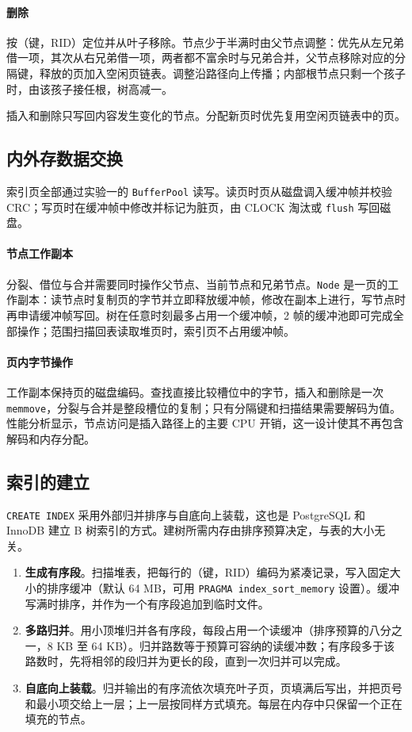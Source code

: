 \documentclass[11pt,a4paper]{ctexart}
\newcommand{\code}[1]{\texttt{#1}}
\begin{document}
\paragraph{删除}按（键，RID）定位并从叶子移除。节点少于半满时由父节点调整：优先从左兄弟借一项，其次从右兄弟借一项，两者都不富余时与兄弟合并，父节点移除对应的分隔键，释放的页加入空闲页链表。调整沿路径向上传播；内部根节点只剩一个孩子时，由该孩子接任根，树高减一。

插入和删除只写回内容发生变化的节点。分配新页时优先复用空闲页链表中的页。

\subsection{内外存数据交换}

索引页全部通过实验一的 \code{BufferPool} 读写。读页时页从磁盘调入缓冲帧并校验 CRC；写页时在缓冲帧中修改并标记为脏页，由 CLOCK 淘汰或 \code{flush} 写回磁盘。

\paragraph{节点工作副本}分裂、借位与合并需要同时操作父节点、当前节点和兄弟节点。\code{Node} 是一页的工作副本：读节点时复制页的字节并立即释放缓冲帧，修改在副本上进行，写节点时再申请缓冲帧写回。树在任意时刻最多占用一个缓冲帧，2 帧的缓冲池即可完成全部操作；范围扫描回表读取堆页时，索引页不占用缓冲帧。

\paragraph{页内字节操作}工作副本保持页的磁盘编码。查找直接比较槽位中的字节，插入和删除是一次 \code{memmove}，分裂与合并是整段槽位的复制；只有分隔键和扫描结果需要解码为值。性能分析显示，节点访问是插入路径上的主要 CPU 开销，这一设计使其不再包含解码和内存分配。

\subsection{索引的建立}

\code{CREATE INDEX} 采用外部归并排序与自底向上装载，这也是 PostgreSQL 和 InnoDB 建立 B 树索引的方式。建树所需内存由排序预算决定，与表的大小无关。

\begin{enumerate}
  \item \textbf{生成有序段}。扫描堆表，把每行的（键，RID）编码为紧凑记录，写入固定大小的排序缓冲（默认 64 MB，可用 \code{PRAGMA index\_sort\_memory} 设置）。缓冲写满时排序，并作为一个有序段追加到临时文件。
  \item \textbf{多路归并}。用小顶堆归并各有序段，每段占用一个读缓冲（排序预算的八分之一，8 KB 至 64 KB）。归并路数等于预算可容纳的读缓冲数；有序段多于该路数时，先将相邻的段归并为更长的段，直到一次归并可以完成。
  \item \textbf{自底向上装载}。归并输出的有序流依次填充叶子页，页填满后写出，并把页号和最小项交给上一层；上一层按同样方式填充。每层在内存中只保留一个正在填充的节点。
\end{enumerate}
\end{document}
